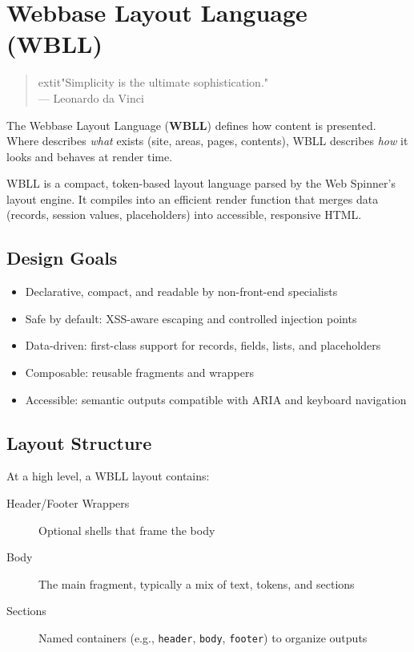 
\chapter{Webbase Layout Language (WBLL)}
\label{chap:wbll}

\begin{quote}
	extit{"Simplicity is the ultimate sophistication."} \\
— Leonardo da Vinci
\end{quote}

The Webbase Layout Language (\textbf{WBLL}) defines how content is presented. Where \wbdl{} describes \textit{what} exists (site, areas, pages, contents), WBLL describes \textit{how} it looks and behaves at render time.

WBLL is a compact, token-based layout language parsed by the Web Spinner’s layout engine. It compiles into an efficient render function that merges data (records, session values, placeholders) into accessible, responsive HTML.

\section{Design Goals}
\label{sec:wbll-goals}

\begin{itemize}
	\item Declarative, compact, and readable by non-front-end specialists
	\item Safe by default: XSS-aware escaping and controlled injection points
	\item Data-driven: first-class support for records, fields, lists, and placeholders
	\item Composable: reusable fragments and wrappers
	\item Accessible: semantic outputs compatible with ARIA and keyboard navigation
\end{itemize}

\section{Layout Structure}
\label{sec:wbll-structure}

At a high level, a WBLL layout contains:

\begin{description}
	\item[Header/Footer Wrappers] Optional shells that frame the body
	\item[Body] The main fragment, typically a mix of text, tokens, and sections
	\item[Sections] Named containers (e.g., \texttt{header}, \texttt{body}, \texttt{footer}) to organize outputs
\end{description}

